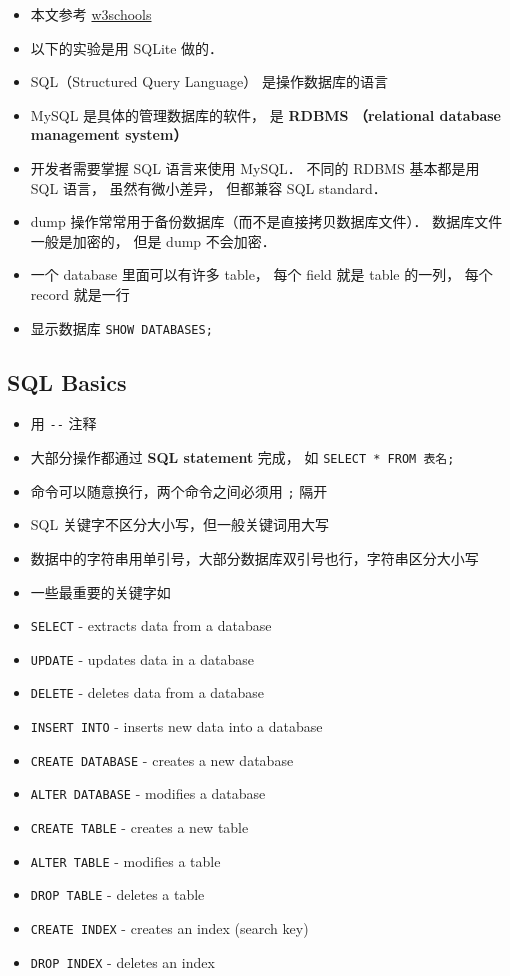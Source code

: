 
\begin{issues}
\issueDraft
\end{issues}

\begin{itemize}
\item 本文参考 \href{https://www.w3schools.com/sql/default.asp}{w3schools}
\item 以下的实验是用 SQLite 做的．
\item SQL（Structured Query Language） 是操作数据库的语言
\item MySQL 是具体的管理数据库的软件， 是 \textbf{RDBMS （relational database management system）}
\item 开发者需要掌握 SQL 语言来使用 MySQL． 不同的 RDBMS 基本都是用 SQL 语言， 虽然有微小差异， 但都兼容 SQL standard．
\item dump 操作常常用于备份数据库（而不是直接拷贝数据库文件）． 数据库文件一般是加密的， 但是 dump 不会加密．
\item 一个 database 里面可以有许多 table， 每个 field 就是 table 的一列， 每个 record 就是一行
\item 显示数据库 \verb`SHOW DATABASES;`
\end{itemize}

\subsection{SQL Basics}
\begin{itemize}
\item 用 \verb|--| 注释
\item 大部分操作都通过 \textbf{SQL statement} 完成， 如 \verb`SELECT * FROM 表名;`
\item 命令可以随意换行，两个命令之间必须用 \verb|;| 隔开
\item SQL 关键字不区分大小写，但一般关键词用大写
\item 数据中的字符串用单引号，大部分数据库双引号也行，字符串区分大小写
\item 一些最重要的关键字如
\item \verb`SELECT` - extracts data from a database
\item \verb`UPDATE` - updates data in a database
\item \verb`DELETE` - deletes data from a database
\item \verb`INSERT INTO` - inserts new data into a database
\item \verb`CREATE DATABASE` - creates a new database
\item \verb`ALTER DATABASE` - modifies a database
\item \verb`CREATE TABLE` - creates a new table
\item \verb`ALTER TABLE` - modifies a table
\item \verb`DROP TABLE` - deletes a table
\item \verb`CREATE INDEX` - creates an index (search key)
\item \verb`DROP INDEX` - deletes an index
\end{itemize}

